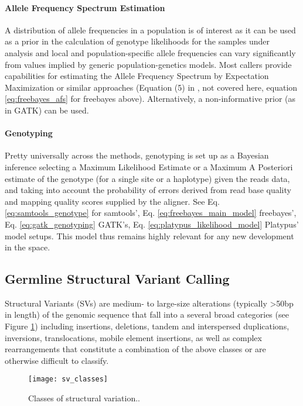 \paragraph{Allele Frequency Spectrum Estimation}

A distribution of allele frequencies in a population is of interest as it can be used as a prior in the calculation of genotype likelihoods for the samples under analysis and local and population-specific allele frequencies can vary significantly from values implied by generic population-genetics models. Most callers provide capabilities for estimating the Allele Frequency Spectrum by Expectation Maximization or similar approaches (Equation (5) in \autocite{li2011statistical}, not covered here, equation \ref{eq:freebayes_afs} for freebayes above). Alternatively, a non-informative prior (as in GATK) can be used.

\paragraph{Genotyping}

Pretty universally across the methods, genotyping is set up as a Bayesian inference selecting a Maximum Likelihood Estimate or a Maximum A Posteriori estimate of the genotype (for a single site or a haplotype) given the reads data, and taking into account the probability of errors derived from read base quality and mapping quality scores supplied by the aligner. See Eq. \ref{eq:samtools_genotype} for samtools', Eq. \ref{eq:freebayes_main_model} freebayes', Eq. \ref{eq:gatk_genotyping} GATK's, Eq. \ref{eq:platypus_likelihood_model} Platypus' model setups. This model thus remains highly relevant for any new development in the space. 

\subsection{Germline Structural Variant Calling}
\label{sec:bg_germline_sv_calling}

Structural Variants (SVs) are medium- to large-size alterations (typically >50bp in length) of the genomic sequence that fall into a several broad categories (see Figure \ref{fig:sv_classes}) including insertions, deletions, tandem and interspersed duplications, inversions, translocations, mobile element insertions, as well as complex rearrangements that constitute a combination of the above classes or are otherwise difficult to classify. 

\begin{figure}[H]
    \texttt{[image: sv\_classes]}
    \centering
    \caption {Classes of structural variation.\autocite{alkan2011genome}.}
    \label{fig:sv_classes}
\end{figure}

